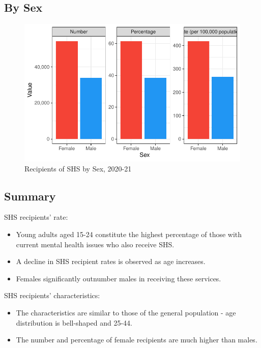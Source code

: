 \documentclass[
  a4paper,
  DIV=11,
  numbers=noendperiod]{scrreport}
\begin{document}
\hypertarget{by-sex-4}{%
\subsection{By Sex}\label{by-sex-4}}

\begin{figure}

\caption{\label{fig-shs-s}Recipients of SHS by Sex, 2020-21}

{\centering \includegraphics{./chap3-shs_files/figure-pdf/fig-shs-s-1.pdf}

}

\end{figure}

\hypertarget{summary-5}{%
\subsection{Summary}\label{summary-5}}

SHS recipients' rate:

\begin{itemize}
\item
  Young adults aged 15-24 constitute the highest percentage of those
  with current mental health issues who also receive SHS.
\item
  A decline in SHS recipient rates is observed as age increases.
\item
  Females significantly outnumber males in receiving these services.
\end{itemize}

SHS recipients' characteristics:

\begin{itemize}
\item
  The characteristics are similar to those of the general population -
  age distribution is bell-shaped and 25-44.
\item
  The number and percentage of female recipients are much higher than
  males.
\end{itemize}
\end{document}
